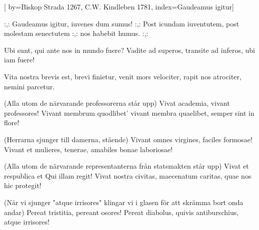 [
by={Biskop Strada 1267, C.W. Kindleben 1781},
index={Gaudeamus igitur}]

\beginverse*
:,: Gaudeamus igitur,
iuvenes dum sumus! :,:
Post icundam iuventutem,
post molestam senectutem
:,: nos habebit humus. :,:
\endverse	

\beginverse*
Ubi sunt, qui ante nos
in mundo fuere?
Vadite ad superos,
transite ad inferos,
ubi iam fuere!
\endverse	

\beginverse*
Vita nostra brevis est,
brevi finietur,
venit mors velociter,
rapit nos atrociter,
nemini parcetur.
\endverse	

\beginverse*
(Alla utom de närvarande professorerna står upp)
Vivat academia,
vivant professores!
Vivant membrum quodlibet'
vivant membra quaelibet,
semper sint in flore!
\endverse	

\beginverse*
(Herrarna sjunger till damerna, stående)
Vivant omnes virgines,
faciles formosae!
Vivant et mulieres,
tenerae, amabiles
bonae laboriosae!
\endverse	

\beginverse*
(Alla utom de närvarande representanterna från statsmakten står upp)
Vivat et respublica
et Qui illam regit!
Vivat nostra civitas,
maecenatum caritas,
quae nos hic protegit!
\endverse	

\beginverse*
(När vi sjunger "atque irrisores" klingar vi i glasen för att skrämma bort onda andar)
Pereat tristitia,
pereant osores!
Pereat diabolus,
quivis antiburschius,
atque irrisores!
\endverse	

\vspace{1cm}
\endsong


